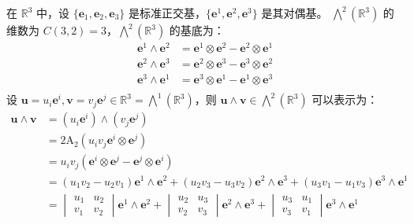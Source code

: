 \begin{example}[三维欧氏空间的向量外积]
    在 $\mathbb{R}^3$ 中，设 $\{\mathbf{e}_1,\mathbf{e}_2,\mathbf{e}_3\}$ 是标准正交基，$\{\mathbf{e}^1,\mathbf{e}^2,\mathbf{e}^3\}$ 是其对偶基。
    $\bigwedge^2(\mathbb{R}^3)$ 的维数为 $C(3,2) = 3$，$\bigwedge^2(\mathbb{R}^3)$ 的基底为：
    \begin{align*}
        \mathbf{e}^1\wedge \mathbf{e}^2 &= \mathbf{e}^1 \otimes \mathbf{e}^2 - \mathbf{e}^2 \otimes \mathbf{e}^1 \\
        \mathbf{e}^2\wedge \mathbf{e}^3 &= \mathbf{e}^2 \otimes \mathbf{e}^3 - \mathbf{e}^3 \otimes \mathbf{e}^2 \\
        \mathbf{e}^3\wedge \mathbf{e}^1 &= \mathbf{e}^3 \otimes \mathbf{e}^1 - \mathbf{e}^1 \otimes \mathbf{e}^3 \\
    \end{align*}
    设 $\mathbf{u}=u_i\mathbf{e}^i,\mathbf{v}=v_j\mathbf{e}^j\in \mathbb{R}^3 = \bigwedge^1(\mathbb{R}^3)$，则 $\mathbf{u}\wedge \mathbf{v} \in \bigwedge^2(\mathbb{R}^3)$ 可以表示为：
    \begin{align*}
        \mathbf{u}\wedge \mathbf{v} &= (u_i\mathbf{e}^i) \wedge (v_j\mathbf{e}^j) \\
        &= 2 \mathrm{A_2}(u_i v_j \mathbf{e}^i \otimes \mathbf{e}^j) \\
        &= u_iv_j (\mathbf{e}^i \otimes \mathbf{e}^j - \mathbf{e}^j \otimes \mathbf{e}^i) \\
        &= (u_1v_2 - u_2v_1) \mathbf{e}^1 \wedge \mathbf{e}^2 + (u_2v_3 - u_3v_2) \mathbf{e}^2 \wedge \mathbf{e}^3 + (u_3v_1 - u_1v_3) \mathbf{e}^3 \wedge \mathbf{e}^1\\
        &= \begin{vmatrix}
            u_1 & u_2 \\
            v_1 & v_2
        \end{vmatrix} \mathbf{e}^1 \wedge \mathbf{e}^2 +
        \begin{vmatrix}
            u_2 & u_3 \\
            v_2 & v_3
        \end{vmatrix} \mathbf{e}^2 \wedge \mathbf{e}^3 +
        \begin{vmatrix}
            u_3 & u_1 \\
            v_3 & v_1
        \end{vmatrix} \mathbf{e}^3 \wedge \mathbf{e}^1
    \end{align*}


\end{example}
